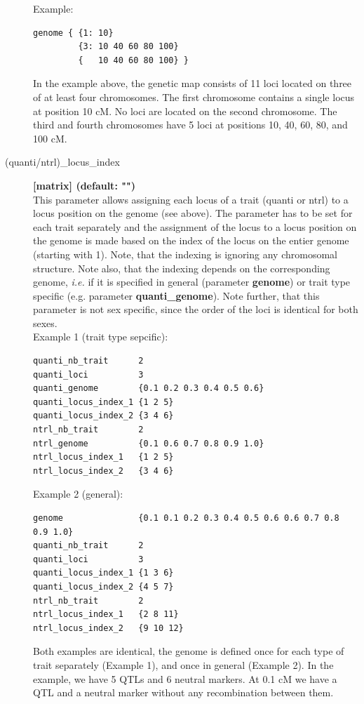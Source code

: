 \documentclass[letterpaper,12pt,oneside]{book}
\begin{document}
\begin{description}
Example:
\begin{lstlisting}[frame=single]
genome { {1: 10}
         {3: 10 40 60 80 100}
         {   10 40 60 80 100} }
\end{lstlisting} 
In the example above, the genetic map consists of 11 loci located on three of at least four
chromosomes. The first chromosome contains a single locus at position 10 cM. No loci are located on
the second chromosome. The third and fourth chromosomes have 5 loci at positions 10, 40, 60, 80, and 100 cM.


\item[(quanti/ntrl)\_locus\_index\index{quanti\_locus\_index}\index{ntrl\_locus\_index}]\textbf{[matrix]
(default: "")}\\
This parameter allows assigning each locus of a trait (quanti or ntrl) to a locus position on the genome (see above). The parameter has to be set for each trait
separately and the assignment of the locus to a locus position on the genome is made based on the
index of the locus on the entier genome (starting with 1). Note, that the indexing is ignoring any
chromosomal structure. Note also, that the indexing depends on the corresponding genome, \textit{i.e.} if it
is specified in general (parameter \textbf{genome}) or trait type specific (e.g. parameter
\textbf{quanti\_genome}). Note further, that this parameter is not sex specific, since the
order of the loci is identical for both sexes.   \\

Example 1 (trait type sepcific):
\begin{lstlisting}[frame=single]
quanti_nb_trait      2
quanti_loci          3
quanti_genome        {0.1 0.2 0.3 0.4 0.5 0.6}
quanti_locus_index_1 {1 2 5}
quanti_locus_index_2 {3 4 6}
ntrl_nb_trait        2
ntrl_genome          {0.1 0.6 0.7 0.8 0.9 1.0}
ntrl_locus_index_1   {1 2 5}
ntrl_locus_index_2   {3 4 6}
\end{lstlisting} 

Example 2 (general):
\begin{lstlisting}[frame=single]
genome               {0.1 0.1 0.2 0.3 0.4 0.5 0.6 0.6 0.7 0.8 0.9 1.0}
quanti_nb_trait      2
quanti_loci          3
quanti_locus_index_1 {1 3 6}
quanti_locus_index_2 {4 5 7}
ntrl_nb_trait        2
ntrl_locus_index_1   {2 8 11}
ntrl_locus_index_2   {9 10 12}
\end{lstlisting} 

Both examples are identical, the genome is defined once for each type of trait separately (Example
1), and once in general (Example 2). In the example, we have 5 QTLs and 6 neutral markers. 
At 0.1 cM we have a QTL and a neutral marker without any recombination between them.


\end{description}
\end{document}
